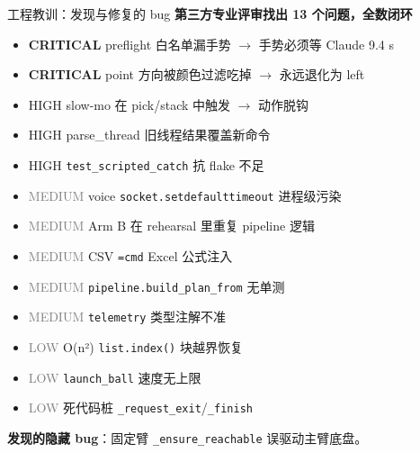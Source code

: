\documentclass[aspectratio=169, 11pt]{beamer}
\begin{document}
\begin{frame}{工程教训：发现与修复的 bug}
\textbf{第三方专业评审找出 13 个问题，全数闭环}
\vspace{4pt}
\begin{itemize}\footnotesize
\item \textcolor{red!70!black}{\textbf{CRITICAL}} preflight 白名单漏手势 $\to$ 手势必须等 Claude 9.4 s
\item \textcolor{red!70!black}{\textbf{CRITICAL}} point 方向被颜色过滤吃掉 $\to$ 永远退化为 left
\item \textcolor{orange!80!black}{HIGH} slow-mo 在 pick/stack 中触发 $\to$ 动作脱钩
\item \textcolor{orange!80!black}{HIGH} parse\_thread 旧线程结果覆盖新命令
\item \textcolor{orange!80!black}{HIGH} \texttt{test\_scripted\_catch} 抗 flake 不足
\item \textcolor{gray}{MEDIUM} voice \texttt{socket.setdefaulttimeout} 进程级污染
\item \textcolor{gray}{MEDIUM} Arm B 在 rehearsal 里重复 pipeline 逻辑
\item \textcolor{gray}{MEDIUM} CSV \texttt{=cmd} Excel 公式注入
\item \textcolor{gray}{MEDIUM} \texttt{pipeline.build\_plan\_from} 无单测
\item \textcolor{gray}{MEDIUM} \texttt{telemetry} 类型注解不准
\item \textcolor{gray}{LOW} O(n²) \texttt{list.index()} 块越界恢复
\item \textcolor{gray}{LOW} \texttt{launch\_ball} 速度无上限
\item \textcolor{gray}{LOW} 死代码桩 \texttt{\_request\_exit}/\texttt{\_finish}
\end{itemize}

\vspace{4pt}
\textbf{发现的隐藏 bug}：固定臂 \texttt{\_ensure\_reachable} 误驱动主臂底盘。
\end{frame}
\end{document}
